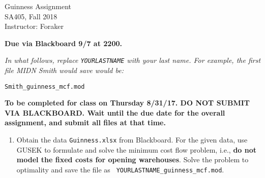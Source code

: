 \documentclass[10pt]{article}
\begin{document}
\begin{center}
  {\sc Guinness Assignment}\\
  {\sc SA405, Fall 2018} \\
  {\sc Instructor: Foraker}
\end{center}

\medskip

{\bf Due via Blackboard 9/7 at 2200.}

\medskip

{\it In what follows, replace {\tt YOURLASTNAME} with your last name.
  For example, the first file MIDN Smith would save would be:}

\begin{verbatim}
Smith_guinness_mcf.mod
\end{verbatim}

\medskip

{\bf To be completed for class on Thursday 8/31/17.  DO NOT SUBMIT VIA BLACKBOARD.  Wait until the due date for the overall assignment, and submit all files at that time.}
\begin{enumerate} 
\item Obtain the data {\tt Guinness.xlsx} from Blackboard. For the given data, use GUSEK to
  formulate and solve the minimum cost flow problem, i.e., {\bf do not model the
    fixed costs for opening warehouses}.
  Solve the problem to optimality and save the file as {\tt
    YOURLASTNAME\_guinness\_mcf.mod}.
\end{enumerate}
\end{document}
